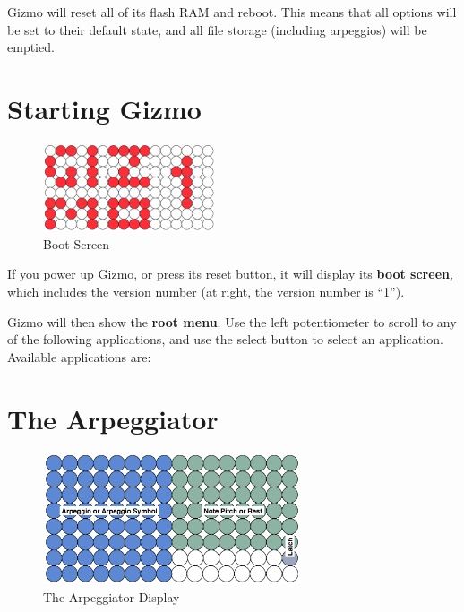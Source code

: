 \documentclass{article}
\begin{document}
Gizmo will reset all of its flash RAM and reboot.  This means that all options will be set to their default state, and all file storage (including arpeggios) will be emptied.

\section{Starting Gizmo}

\begin{figure}
\vspace{-1.5em}\includegraphics[width=2in]{Gizmo1.pdf}
\vspace{-2em}\caption{\small Boot Screen}\vspace{-2em}
\label{BootScreen}
\end{figure}

If you power up Gizmo, or press its reset button, it will display its {\bf boot screen}, which includes the version number (at right, the version number is ``1'').

Gizmo will then show the {\bf root menu}.  Use the left potentiometer to scroll to any of the following applications, and use the select button to select an application.  Available applications are:
\section {The Arpeggiator}

\begin{figure}
\vspace{-1.5em}\includegraphics[width=3in]{arpeggio.pdf}
\vspace{-2em}\caption{\small The Arpeggiator Display}\vspace{-1em}
\label{arpeggiator}
\end{figure}
\end{document}
